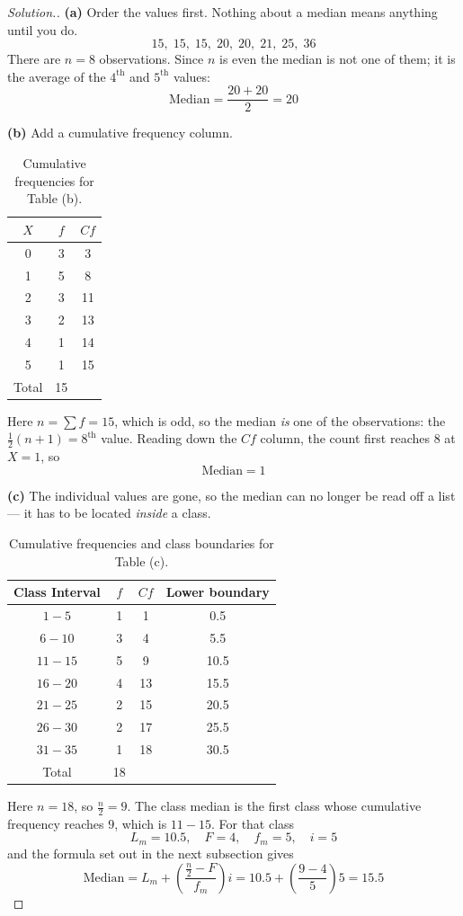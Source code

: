 \documentclass[11pt,a4paper]{article}
\theoremstyle{definition}
\newenvironment{solution}
  {\renewcommand{\qedsymbol}{}\begin{proof}[\textit{Solution}.]}
  {\end{proof}}
\begin{document}
\begin{solution}
\textbf{(a)} Order the values first. Nothing about a median means anything until you do.
\[15,\; 15,\; 15,\; 20,\; 20,\; 21,\; 25,\; 36\]
There are $n=8$ observations. Since $n$ is even the median is not one of them; it is the
average of the $4^{\text{th}}$ and $5^{\text{th}}$ values:
\[\text{Median}=\frac{20+20}{2}=20\]

\textbf{(b)} Add a cumulative frequency column.
\begin{table}[H]
\centering
\begin{tabular}{|c|c|c|}
\hline $X$ & $f$ & $Cf$\\
\hline 0&3&3\\
1&5&8\\ 2&3&11\\ 3&2&13\\ 4&1&14\\ 5&1&15\\
\hline
Total & 15 & \\
\hline
\end{tabular}
\caption{Cumulative frequencies for Table (b).}
\end{table}
Here $n=\sum f=15$, which is odd, so the median \emph{is} one of the observations: the
$\tfrac{1}{2}(n+1)=8^{\text{th}}$ value. Reading down the $Cf$ column, the count first
reaches $8$ at $X=1$, so
\[\text{Median}=1\]

\textbf{(c)} The individual values are gone, so the median can no longer be read off a
list --- it has to be located \emph{inside} a class.
\begin{table}[H]
\centering
\begin{tabular}{|c|c|c|c|}
\hline Class Interval & $f$ & $Cf$ & Lower boundary\\
\hline $1-5$&1&1&0.5\\
$6-10$&3&4&5.5\\
$11-15$&5&9&10.5\\
$16-20$&4&13&15.5\\
$21-25$&2&15&20.5\\
$26-30$&2&17&25.5\\
$31-35$&1&18&30.5\\
\hline
Total & 18 & & \\
\hline
\end{tabular}
\caption{Cumulative frequencies and class boundaries for Table (c).}
\end{table}
Here $n=18$, so $\tfrac{n}{2}=9$. The class median is the first class whose cumulative
frequency reaches $9$, which is $11-15$. For that class
\[L_m=10.5,\quad  F=4,\quad  f_m=5,\quad  i=5\]
and the formula set out in the next subsection gives
\[\text{Median}=L_m+\left(\frac{\frac{n}{2}-F}{f_m}\right)i
=10.5+\left(\frac{9-4}{5}\right)5=15.5\]


\end{solution}
\end{document}
